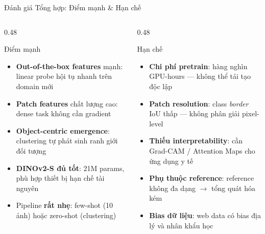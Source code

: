 \documentclass[aspectratio=169]{beamer}
\begin{document}
\begin{frame}[t,shrink=15]{Đánh giá Tổng hợp: Điểm mạnh \& Hạn chế}
    \begin{columns}[t]
        \begin{column}{0.48\textwidth}
            \begin{exampleblock}{Điểm mạnh}
                \begin{itemize}
                    \item \textbf{Out-of-the-box features} mạnh: linear probe hội tụ nhanh trên domain mới
                    \item \textbf{Patch features} chất lượng cao: dense task không cần gradient
                    \item \textbf{Object-centric emergence}: clustering tự phát sinh ranh giới đối tượng
                    \item \textbf{DINOv2-S đủ tốt}: 21M params, phù hợp thiết bị hạn chế tài nguyên
                    \item Pipeline \textbf{rất nhẹ}: few-shot (10 ảnh) hoặc zero-shot (clustering)
                \end{itemize}
            \end{exampleblock}
        \end{column}
        \begin{column}{0.48\textwidth}
            \begin{alertblock}{Hạn chế}
                \begin{itemize}
                    \item \textbf{Chi phí pretrain}: hàng nghìn GPU-hours --- không thể tái tạo độc lập
                    \item \textbf{Patch resolution}: class \textit{border} IoU thấp --- không phân giải pixel-level
                    \item \textbf{Thiếu interpretability}: cần Grad-CAM / Attention Maps cho ứng dụng y tế
                    \item \textbf{Phụ thuộc reference}: reference không đa dạng $\to$ tổng quát hóa kém
                    \item \textbf{Bias dữ liệu}: web data có bias địa lý và nhân khẩu học
                \end{itemize}
            \end{alertblock}
        \end{column}
    \end{columns}
\end{frame}
\end{document}
